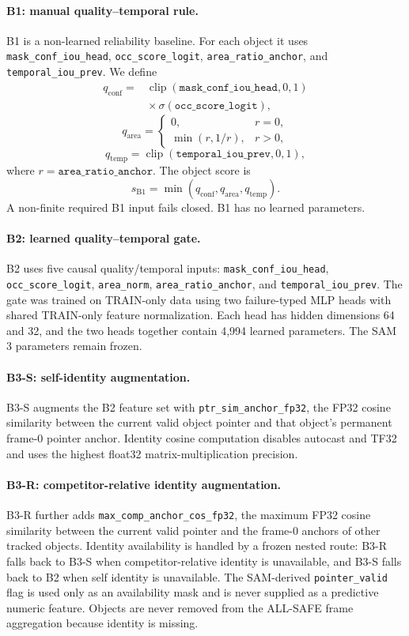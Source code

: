\documentclass[10pt,twocolumn,letterpaper]{article}
\begin{document}
\paragraph{B1: manual quality--temporal rule.}
B1 is a non-learned reliability baseline.  For each object it uses
\texttt{mask\_conf\_iou\_head}, \texttt{occ\_score\_logit},
\texttt{area\_ratio\_anchor}, and \texttt{temporal\_iou\_prev}.  We define
\[
\begin{aligned}
q_{\mathrm{conf}}
  ={}& \operatorname{clip}(
       \texttt{mask\_conf\_iou\_head},0,1) \\
     & {}\times \sigma(\texttt{occ\_score\_logit}),
\end{aligned}
\]
\[
q_{\mathrm{area}} =
\begin{cases}
0, & r=0,\\
\min(r,1/r), & r>0,
\end{cases}
\]
\[
q_{\mathrm{temp}}
  = \operatorname{clip}(\texttt{temporal\_iou\_prev},0,1),
\]
where \(r=\texttt{area\_ratio\_anchor}\).
The object score is
\[
s_{\mathrm{B1}}
  = \min(q_{\mathrm{conf}},q_{\mathrm{area}},q_{\mathrm{temp}}).
\]
A non-finite required B1 input fails closed.  B1 has no learned parameters.

\paragraph{B2: learned quality--temporal gate.}
B2 uses five causal quality/temporal inputs:
\texttt{mask\_conf\_iou\_head}, \texttt{occ\_score\_logit},
\texttt{area\_norm}, \texttt{area\_ratio\_anchor}, and
\texttt{temporal\_iou\_prev}.  The gate was trained on TRAIN-only data using
two failure-typed MLP heads with shared TRAIN-only feature normalization.
Each head has hidden dimensions 64 and 32, and the two heads together contain
4,994 learned parameters.  The SAM 3 parameters remain frozen.

\paragraph{B3-S: self-identity augmentation.}
B3-S augments the B2 feature set with
\texttt{ptr\_sim\_anchor\_fp32}, the FP32 cosine similarity between the
current valid object pointer and that object's permanent frame-0 pointer
anchor.  Identity cosine computation disables autocast and TF32 and uses the
highest float32 matrix-multiplication precision.

\paragraph{B3-R: competitor-relative identity augmentation.}
B3-R further adds \texttt{max\_comp\_anchor\_cos\_fp32}, the maximum FP32
cosine similarity between the current valid pointer and the frame-0 anchors
of other tracked objects.  Identity availability is handled by a frozen
nested route: B3-R falls back to B3-S when competitor-relative identity is
unavailable, and B3-S falls back to B2 when self identity is unavailable.
The SAM-derived \texttt{pointer\_valid} flag is used only as an availability
mask and is never supplied as a predictive numeric feature.  Objects are
never removed from the ALL-SAFE frame aggregation because identity is
missing.
\end{document}
